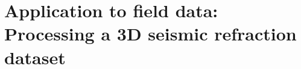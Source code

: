 \documentclass[a4paper,fleqn]{cas-sc}
\begin{document}

\section{Application to field data: Processing a 3D seismic refraction dataset}
\end{document}
